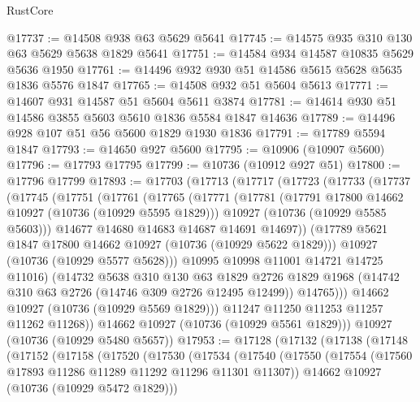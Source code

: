 \begin{lexlean}{RustCore}
\begin{coremodule}
@17737 := @14508 @938 @63 @5629 @5641
@17745 := @14575 @935 @310 @130 @63 @5629 @5638 @1829 @5641
@17751 := @14584 @934 @14587 @10835 @5629 @5636 @1950
@17761 := @14496 @932 @930 @51 @14586 @5615 @5628 @5635 @1836 @5576 @1847
@17765 := @14508 @932 @51 @5604 @5613
@17771 := @14607 @931 @14587 @51 @5604 @5611 @3874
@17781 := @14614 @930 @51 @14586 @3855 @5603 @5610 @1836 @5584 @1847 @14636
@17789 := @14496 @928 @107 @51 @56 @5600 @1829 @1930 @1836
@17791 := @17789 @5594 @1847
@17793 := @14650 @927 @5600
@17795 := @10906 (@10907 @5600)
@17796 := @17793 @17795
@17799 := @10736 (@10912 @927 @51)
@17800 := @17796 @17799
@17893 := @17703
    (@17713
      (@17717
        (@17723
          (@17733
            (@17737
              (@17745
                (@17751
                  (@17761
                    (@17765
                      (@17771
                        (@17781
                          (@17791 @17800 @14662 @10927 (@10736 (@10929 @5595 @1829)))
                          @10927
                          (@10736 (@10929 @5585 @5603)))
                        @14677
                        @14680
                        @14683
                        @14687
                        @14691
                        @14697))
                    (@17789 @5621 @1847 @17800 @14662 @10927 (@10736 (@10929 @5622 @1829)))
                    @10927
                    (@10736 (@10929 @5577 @5628)))
                  @10995
                  @10998
                  @11001
                  @14721
                  @14725
                  @11016)
                (@14732
                  @5638
                  @310
                  @130
                  @63
                  @1829
                  @2726
                  @1829
                  @1968
                  (@14742 @310 @63 @2726 (@14746 @309 @2726 @12495 @12499))
                  @14765)))
            @14662
            @10927
            (@10736 (@10929 @5569 @1829)))
          @11247
          @11250
          @11253
          @11257
          @11262
          @11268))
      @14662
      @10927
      (@10736 (@10929 @5561 @1829)))
    @10927
    (@10736 (@10929 @5480 @5657))
@17953 := @17128
    (@17132
      (@17138
        (@17148
          (@17152
            (@17158
              (@17520
                (@17530
                  (@17534
                    (@17540
                      (@17550
                        (@17554 (@17560 @17893 @11286 @11289 @11292 @11296 @11301 @11307))
                        @14662
                        @10927
                        (@10736 (@10929 @5472 @1829)))

\end{coremodule}
\end{lexlean}
